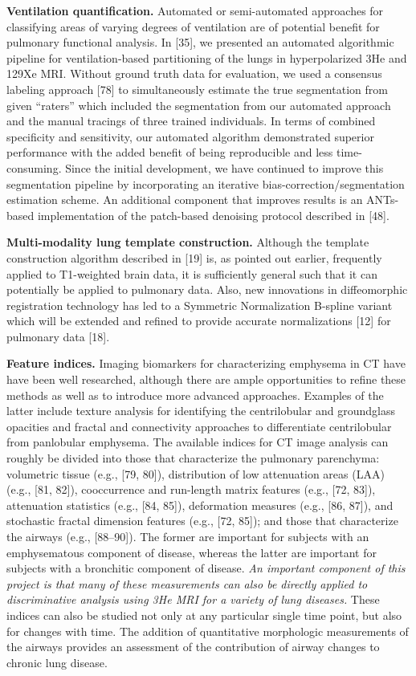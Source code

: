 \documentclass[11pt,]{article}
\begin{document}
\textbf{Ventilation quantification.} Automated or semi-automated
approaches for classifying areas of varying degrees of ventilation are
of potential benefit for pulmonary functional analysis. In {[}35{]}, we
presented an automated algorithmic pipeline for ventilation-based
partitioning of the lungs in hyperpolarized 3He and 129Xe MRI. Without
ground truth data for evaluation, we used a consensus labeling approach
{[}78{]} to simultaneously estimate the true segmentation from given
``raters'' which included the segmentation from our automated approach
and the manual tracings of three trained individuals. In terms of
combined specificity and sensitivity, our automated algorithm
demonstrated superior performance with the added benefit of being
reproducible and less time-consuming. Since the initial development, we
have continued to improve this segmentation pipeline by incorporating an
iterative bias-correction/segmentation estimation scheme. An additional
component that improves results is an ANTs-based implementation of the
patch-based denoising protocol described in {[}48{]}.

\textbf{Multi-modality lung template construction.} Although the
template construction algorithm described in {[}19{]} is, as pointed out
earlier, frequently applied to T1-weighted brain data, it is
sufficiently general such that it can potentially be applied to
pulmonary data. Also, new innovations in diffeomorphic registration
technology has led to a Symmetric Normalization B-spline variant which
will be extended and refined to provide accurate normalizations {[}12{]}
for pulmonary data {[}18{]}.

\textbf{Feature indices.} Imaging biomarkers for characterizing
emphysema in CT have have been well researched, although there are ample
opportunities to refine these methods as well as to introduce more
advanced approaches. Examples of the latter include texture analysis for
identifying the centrilobular and groundglass opacities and fractal and
connectivity approaches to differentiate centrilobular from panlobular
emphysema. The available indices for CT image analysis can roughly be
divided into those that characterize the pulmonary parenchyma:
volumetric tissue (e.g., {[}79, 80{]}), distribution of low attenuation
areas (LAA) (e.g., {[}81, 82{]}), cooccurrence and run-length matrix
features (e.g., {[}72, 83{]}), attenuation statistics (e.g., {[}84,
85{]}), deformation measures (e.g., {[}86, 87{]}), and stochastic
fractal dimension features (e.g., {[}72, 85{]}); and those that
characterize the airways (e.g., {[}88--90{]}). The former are important
for subjects with an emphysematous component of disease, whereas the
latter are important for subjects with a bronchitic component of
disease. \emph{An important component of this project is that many of
these measurements can also be directly applied to discriminative
analysis using 3He MRI for a variety of lung diseases.} These indices
can also be studied not only at any particular single time point, but
also for changes with time. The addition of quantitative morphologic
measurements of the airways provides an assessment of the contribution
of airway changes to chronic lung disease.
\end{document}
